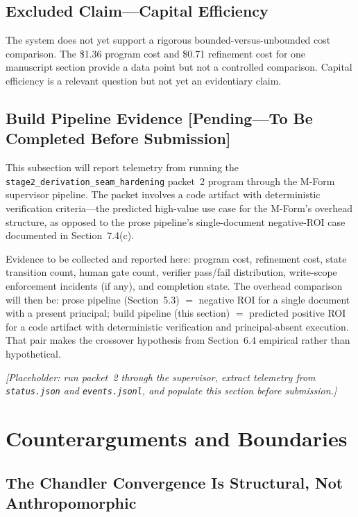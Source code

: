 \documentclass[11pt]{article}
\begin{document}
\subsection{Excluded Claim---Capital Efficiency}

The system does not yet support a rigorous bounded-versus-unbounded cost comparison. The \$1.36 program cost and \$0.71 refinement cost for one manuscript section provide a data point but not a controlled comparison. Capital efficiency is a relevant question but not yet an evidentiary claim.

\subsection{Build Pipeline Evidence [Pending---To Be Completed Before Submission]}

This subsection will report telemetry from running the \texttt{stage2\_derivation\_seam\_hardening} packet~2 program through the M-Form supervisor pipeline. The packet involves a code artifact with deterministic verification criteria---the predicted high-value use case for the M-Form's overhead structure, as opposed to the prose pipeline's single-document negative-ROI case documented in Section~7.4(c).

Evidence to be collected and reported here: program cost, refinement cost, state transition count, human gate count, verifier pass/fail distribution, write-scope enforcement incidents (if any), and completion state. The overhead comparison will then be: prose pipeline (Section~5.3) $=$ negative ROI for a single document with a present principal; build pipeline (this section) $=$ predicted positive ROI for a code artifact with deterministic verification and principal-absent execution. That pair makes the crossover hypothesis from Section~6.4 empirical rather than hypothetical.

\emph{[Placeholder: run packet~2 through the supervisor, extract telemetry from \texttt{status.json} and \texttt{events.jsonl}, and populate this section before submission.]}


\section{Counterarguments and Boundaries}

\subsection{The Chandler Convergence Is Structural, Not Anthropomorphic}
\end{document}
